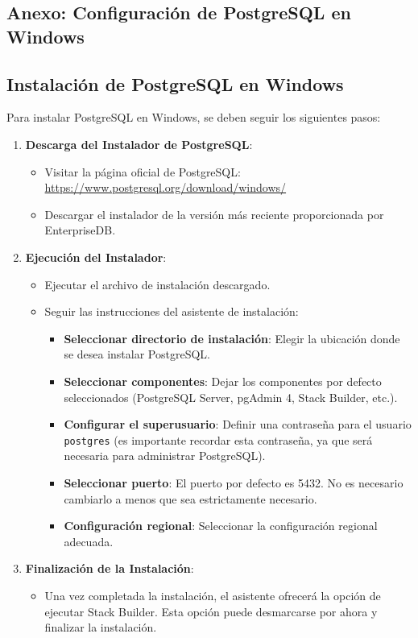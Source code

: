 \subsection{Anexo: Configuración de PostgreSQL en Windows}

\subsection*{Instalación de PostgreSQL en Windows}
Para instalar PostgreSQL en Windows, se deben seguir los siguientes pasos:

\begin{enumerate}
    \item \textbf{Descarga del Instalador de PostgreSQL}:
    \begin{itemize}
        \item Visitar la página oficial de PostgreSQL: \href{https://www.postgresql.org/download/windows/}{https://www.postgresql.org/download/windows/}
        \item Descargar el instalador de la versión más reciente proporcionada por EnterpriseDB.
    \end{itemize}
    \item \textbf{Ejecución del Instalador}:
    \begin{itemize}
        \item Ejecutar el archivo de instalación descargado.
        \item Seguir las instrucciones del asistente de instalación:
        \begin{itemize}
            \item \textbf{Seleccionar directorio de instalación}: Elegir la ubicación donde se desea instalar PostgreSQL.
            \item \textbf{Seleccionar componentes}: Dejar los componentes por defecto seleccionados (PostgreSQL Server, pgAdmin 4, Stack Builder, etc.).
            \item \textbf{Configurar el superusuario}: Definir una contraseña para el usuario \texttt{postgres} (es importante recordar esta contraseña, ya que será necesaria para administrar PostgreSQL).
            \item \textbf{Seleccionar puerto}: El puerto por defecto es 5432. No es necesario cambiarlo a menos que sea estrictamente necesario.
            \item \textbf{Configuración regional}: Seleccionar la configuración regional adecuada.
        \end{itemize}
    \end{itemize}
    \item \textbf{Finalización de la Instalación}:
    \begin{itemize}
        \item Una vez completada la instalación, el asistente ofrecerá la opción de ejecutar Stack Builder. Esta opción puede desmarcarse por ahora y finalizar la instalación.
    \end{itemize}
\end{enumerate}

